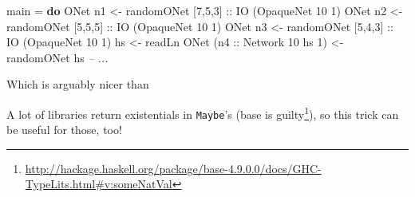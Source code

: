 \documentclass[]{article}
\newenvironment{Shaded}{}{}
\newcommand{\KeywordTok}[1]{\textcolor[rgb]{0.00,0.44,0.13}{\textbf{{#1}}}}
\newcommand{\DataTypeTok}[1]{\textcolor[rgb]{0.56,0.13,0.00}{{#1}}}
\newcommand{\DecValTok}[1]{\textcolor[rgb]{0.25,0.63,0.44}{{#1}}}
\newcommand{\CommentTok}[1]{\textcolor[rgb]{0.38,0.63,0.69}{\textit{{#1}}}}
\newcommand{\OtherTok}[1]{\textcolor[rgb]{0.00,0.44,0.13}{{#1}}}
\newcommand{\FunctionTok}[1]{\textcolor[rgb]{0.02,0.16,0.49}{{#1}}}
\newcommand{\NormalTok}[1]{{#1}}
\renewcommand{\href}[2]{#2\footnote{\url{#1}}}
\begin{document}
\begin{itemize}
\begin{Shaded}
\begin{Highlighting}[]
\NormalTok{main }\FunctionTok{=} \KeywordTok{do}
    \DataTypeTok{ONet} \NormalTok{n1 }\OtherTok{<-} \NormalTok{randomONet [}\DecValTok{7}\NormalTok{,}\DecValTok{5}\NormalTok{,}\DecValTok{3}\NormalTok{]}\OtherTok{ ::} \DataTypeTok{IO} \NormalTok{(}\DataTypeTok{OpaqueNet} \DecValTok{10} \DecValTok{1}\NormalTok{)}
    \DataTypeTok{ONet} \NormalTok{n2 }\OtherTok{<-} \NormalTok{randomONet [}\DecValTok{5}\NormalTok{,}\DecValTok{5}\NormalTok{,}\DecValTok{5}\NormalTok{]}\OtherTok{ ::} \DataTypeTok{IO} \NormalTok{(}\DataTypeTok{OpaqueNet} \DecValTok{10} \DecValTok{1}\NormalTok{)}
    \DataTypeTok{ONet} \NormalTok{n3 }\OtherTok{<-} \NormalTok{randomONet [}\DecValTok{5}\NormalTok{,}\DecValTok{4}\NormalTok{,}\DecValTok{3}\NormalTok{]}\OtherTok{ ::} \DataTypeTok{IO} \NormalTok{(}\DataTypeTok{OpaqueNet} \DecValTok{10} \DecValTok{1}\NormalTok{)}
    \NormalTok{hs }\OtherTok{<-} \NormalTok{readLn}
    \DataTypeTok{ONet} \NormalTok{(}\OtherTok{n4 ::} \DataTypeTok{Network} \DecValTok{10} \NormalTok{hs }\DecValTok{1}\NormalTok{) }\OtherTok{<-} \NormalTok{randomONet hs}
    \CommentTok{-- ...}
\end{Highlighting}
\end{Shaded}

  Which is arguably nicer than

\begin{Shaded}
\end{Shaded}

  A lot of libraries return existentials in \texttt{Maybe}'s
  (\href{http://hackage.haskell.org/package/base-4.9.0.0/docs/GHC-TypeLits.html\#v:someNatVal}{base
  is guilty}), so this trick can be useful for those, too!


\end{itemize}
\end{document}
